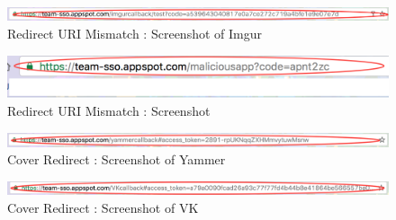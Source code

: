 \begin{figure}[t]
   		 \centering
   		 \includegraphics[width=\columnwidth]{figures/imgur1.png}
   		 \caption{Redirect URI Mismatch : Screenshot of Imgur}
   		 \label{fig:imguredir}
\end{figure}

\begin{figure}[t]
   		 \centering
   		 \includegraphics[width=\columnwidth]{figures/malicious1.png}
   		 \caption{Redirect URI Mismatch : Screenshot}
   		 \label{fig:stravaredir}
\end{figure}

\begin{figure}[t]
   		 \centering
   		 \includegraphics[width=\columnwidth]{figures/yammer1.png}
   		 \caption{Cover Redirect : Screenshot of Yammer}
   		 \label{fig:yammercover}
\end{figure}

\begin{figure}[t]
   		 \centering
   		 \includegraphics[width=\columnwidth]{figures/VK1.png}
   		 \caption{Cover Redirect : Screenshot of VK}
   		 \label{fig:vkcover}
\end{figure}





